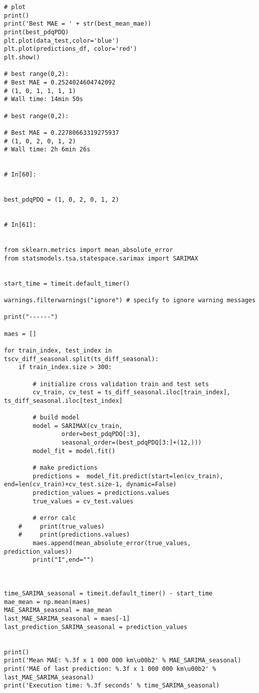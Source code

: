 \begin{verbatim}
# plot
print()
print('Best MAE = ' + str(best_mean_mae))
print(best_pdqPDQ)
plt.plot(data_test,color='blue')
plt.plot(predictions_df, color='red')
plt.show()

# best range(0,2):
# Best MAE = 0.2524024604742092
# (1, 0, 1, 1, 1, 1)
# Wall time: 14min 50s

# best range(0,2):

# Best MAE = 0.22780663319275937
# (1, 0, 2, 0, 1, 2)
# Wall time: 2h 6min 26s


# In[60]:


best_pdqPDQ = (1, 0, 2, 0, 1, 2)


# In[61]:


from sklearn.metrics import mean_absolute_error
from statsmodels.tsa.statespace.sarimax import SARIMAX


start_time = timeit.default_timer()

warnings.filterwarnings("ignore") # specify to ignore warning messages

print("------")

maes = []

for train_index, test_index in tscv_diff_seasonal.split(ts_diff_seasonal):
    if train_index.size > 300:

        # initialize cross validation train and test sets
        cv_train, cv_test = ts_diff_seasonal.iloc[train_index], ts_diff_seasonal.iloc[test_index]

        # build model
        model = SARIMAX(cv_train, 
                order=best_pdqPDQ[:3], 
                seasonal_order=(best_pdqPDQ[3:]+(12,)))
        model_fit = model.fit()

        # make predictions
        predictions =  model_fit.predict(start=len(cv_train), end=len(cv_train)+cv_test.size-1, dynamic=False)
        prediction_values = predictions.values
        true_values = cv_test.values

        # error calc
    #     print(true_values)
    #     print(predictions.values)
        maes.append(mean_absolute_error(true_values, prediction_values))
        print("I",end="")



time_SARIMA_seasonal = timeit.default_timer() - start_time
mae_mean = np.mean(maes)
MAE_SARIMA_seasonal = mae_mean
last_MAE_SARIMA_seasonal = maes[-1]
last_prediction_SARIMA_seasonal = prediction_values


print()
print('Mean MAE: %.3f x 1 000 000 km\u00b2' % MAE_SARIMA_seasonal)
print('MAE of last prediction: %.3f x 1 000 000 km\u00b2' % last_MAE_SARIMA_seasonal)
print('Execution time: %.3f seconds' % time_SARIMA_seasonal)


\end{verbatim}
